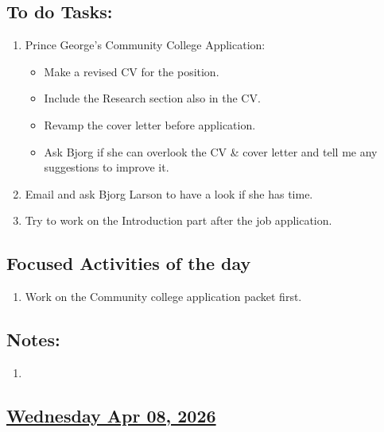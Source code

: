 \subsection*{To do Tasks:}
\begin{enumerate}
    \item Prince George's Community College Application:
    \begin{itemize}
        \item Make a revised CV for the position. \cmark
        \item Include the Research section also in the CV.\cmark
        \item Revamp the cover letter before application.\cmark
        \item Ask Bjorg if she can overlook the CV \& cover letter and tell me any suggestions to improve it. \cmark
    \end{itemize}
    \item Email and ask Bjorg Larson to have a look if she has time. \xmark
    \item Try to work on the Introduction part after the job application.
\end{enumerate}
\subsection*{Focused Activities of the day}
\begin{enumerate}[\ding{212}]  
    \item Work on the Community college application packet first.\cmark
\end{enumerate}
\subsection*{Notes:}
\begin{enumerate}
    \item 
\end{enumerate}
\subsection*{\underline{Wednesday Apr 08, 2026} }
